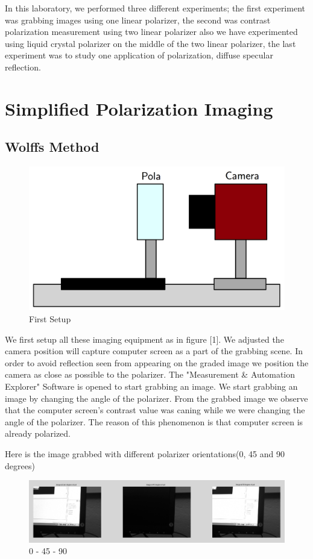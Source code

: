 \documentclass{article}
\begin{document}
	In this laboratory, we performed three different experiments; the first experiment was grabbing images using one linear polarizer, the second was contrast polarization measurement using two linear polarizer also we have experimented using liquid crystal polarizer on the middle of the two linear polarizer, the last experiment was to study one application of polarization, diffuse specular reflection.
	
	
\section{Simplified Polarization Imaging}	
	\subsection{Wolffs Method}
	\begin{figure}[H]
	\centering
	\includegraphics[scale=0.2]{polaSetup1.png}
	\caption{First Setup}
	\end{figure}
	We first setup all these imaging equipment as in figure [1]. We adjusted the camera position will capture computer screen as a part of the grabbing scene. In order to avoid reflection seen from appearing on the graded image we position the camera as close as possible to the polarizer.
The "Measurement \& Automation Explorer" Software is opened to start grabbing an image. We start grabbing an image by changing the angle of the polarizer. From the grabbed image we observe that the computer screen's contrast value was caning while we were changing the angle of the polarizer. The reason of this phenomenon is that computer screen is already polarized.

	Here is the image grabbed with different polarizer orientations(0, 45 and 90 degrees)
	\begin{figure}[H]
	\centering
	\includegraphics[scale=0.32]{PolaFirstPartImage1.png}
	\caption{0 - 45 - 90}
	\end{figure}
	
\end{document}
